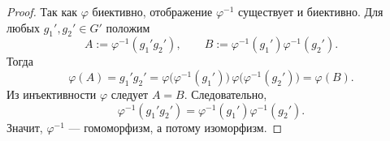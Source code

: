 \begin{proof}
	Так как $\varphi$ биективно, отображение $\varphi^{-1}$ существует и биективно. Для любых $g_1',g_2'\in G'$ положим
	\[
	A:=\varphi^{-1}(g_1'g_2'), \qquad B:=\varphi^{-1}(g_1')\varphi^{-1}(g_2').
	\]
	Тогда
	\[
	\varphi(A)=g_1'g_2'=
	\varphi\bigl(\varphi^{-1}(g_1')\bigr)\,\varphi\bigl(\varphi^{-1}(g_2')\bigr)=\varphi(B).
	\]
	Из инъективности $\varphi$ следует $A=B$. Следовательно,
	\[
	\varphi^{-1}(g_1'g_2')=\varphi^{-1}(g_1')\varphi^{-1}(g_2').
	\]
	Значит, $\varphi^{-1}$ --- гомоморфизм, а потому изоморфизм.
\end{proof}

